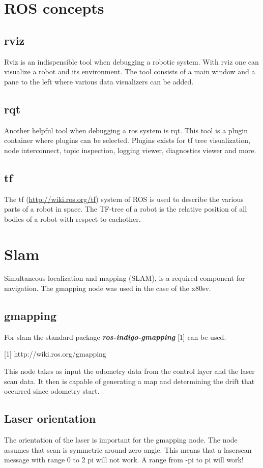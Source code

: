 \documentclass[a4paper]{article}
\newcommand{\rospackage}[1]{\textbf{\textit{#1}}}
\begin{document}
\section{ROS concepts}
\subsection{rviz}
Rviz is an indispensible tool when debugging a robotic system. With rviz one can visualize a robot
and its environment. The tool consists of a main window and a pane to the left where various data
visualizers can be added.

\subsection{rqt}
Another helpful tool when debugging a ros system is rqt. This tool is a plugin container where plugins
can be selected. Plugins exists for tf tree visualization, node interconnect, topic inspection,
logging viewer, diagnostics viewer and more.

\subsection{tf}
The tf (\url{http://wiki.ros.org/tf}) system of ROS is used to describe the various parts of 
a robot in space. The TF-tree of a robot is the relative position of all bodies of a robot
with respect to eachother.

\section{Slam}
Simultaneous localization and mapping (SLAM), is a required component for navigation.
The gmapping node was used in the case of the x80sv.

\subsection{gmapping}

For slam the standard package \rospackage{ros-indigo-gmapping} [1] can be used. 

[1] http://wiki.ros.org/gmapping

This node takes as input the odometry data from the control layer and the laser scan
data. It then is capable of generating a map and determining the drift that occurred
since odometry start.

\subsection{Laser orientation}
The orientation of the laser is important for the gmapping node. The node assumes that
scan is symmetric around zero angle. This means that a laserscan message with range
0 to 2 pi will not work. A range from -pi to pi will work!
\end{document}
